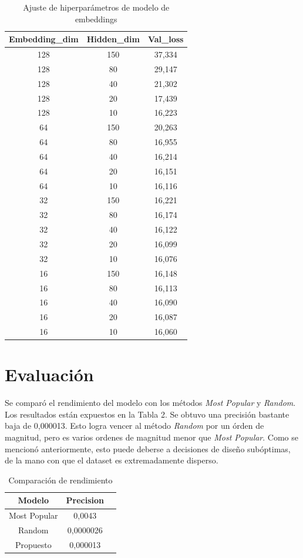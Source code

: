 \documentclass[sigplan,screen]{acmart}
\begin{document}
\begin{table}[h]
\begin{center}
\begin{tabular}{| c | c | c|}
\hline
Embedding_dim & Hidden_dim & Val_loss \\ \hline
128 & 150 & 37,334 \\
128 & 80 & 29,147 \\
128 & 40 & 21,302 \\
128 & 20 & 17,439 \\
128 & 10 & 16,223 \\
64 & 150 & 20,263 \\
64 & 80 & 16,955\\
64 & 40 & 16,214\\
64 & 20 & 16,151\\
64 & 10 & 16,116\\
32 & 150 & 16,221\\
32 & 80 & 16,174\\
32 & 40 & 16,122\\
32 & 20 & 16,099\\
32 & 10 & 16,076\\
16 & 150 & 16,148\\
16 & 80 & 16,113\\
16 & 40 & 16,090\\
16 & 20 & 16,087\\
16 & 10 & 16,060\\
\hline
\end{tabular}
\caption{Ajuste de hiperparámetros de modelo de embeddings}
\label{tab:fruta}
\end{center}
\end{table}

\section{Evaluación}

Se comparó el rendimiento del modelo con los métodos \textit{Most Popular} y \textit{Random}. Los resultados están expuestos en la Tabla 2. Se obtuvo una precisión bastante baja de 0,000013. Esto logra vencer al método \textit{Random} por un órden de magnitud, pero es varios ordenes de magnitud menor que \textit{Most Popular}. Como se mencionó anteriormente, esto puede deberse a decisiones de diseño subóptimas, de la mano con que el dataset es extremadamente disperso.

\begin{table}[h]
\begin{center}
\begin{tabular}{| c | c | c|}
\hline
Modelo & Precision  \\ \hline
Most Popular & 0,0043  \\
Random & 0,0000026 \\
Propuesto & 0,000013 \\

\hline
\end{tabular}
\caption{Comparación de rendimiento}
\label{tab:fruta}
\end{center}
\end{table}
\end{document}
